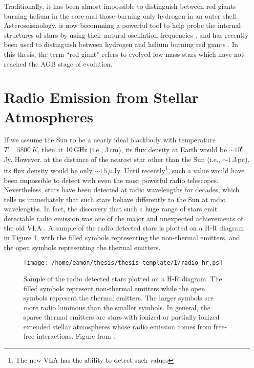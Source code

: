 Traditionally, it has been almost impossible to distinguish between red giants burning helium in the core and those burning only hydrogen in an outer shell. Asteroseismology, is now becomming a powerful tool to help probe the internal structures of stars by using their natural oscillation frequencies \citep{beck_2011}, and has recently been used to distinguish between hydrogen and helium burning red giants \citep{bedding_2011}. In this thesis, the term ``red giant'' refers to evolved low mass stars which have not reached the AGB stage of evolution.

\section{Radio Emission from Stellar Atmospheres}\label{sec:1.6}
If we assume the Sun to be a nearly ideal blackbody with temperature $T=5800\,K$, then at 10\,GHz (i.e., 3\,cm), its flux density at Earth would be $\sim 10^{6}$\,Jy. However, at the distance of the nearest star other than the Sun (i.e., $\sim 1.3$\,pc), its flux density would be only $\sim 15\,\mu$\,Jy. Until recently\footnote{The new VLA has the ability to detect such values}, such a value would have been impossible to detect with even the most powerful radio telescopes. Nevertheless, stars have been detected at radio wavelengths for decades, which tells us immediately that such stars behave differently to the Sun at radio wavelengths. In fact, the discovery that such a huge range of stars emit detectable radio emission was one of the major and unexpected achievements of the old VLA \citep{white_2000}. A sample of the radio detected stars is plotted on a H-R diagram in Figure \ref{fig:1.6.1}, with the filled symbols representing the non-thermal emitters, and the open symbols representing the thermal emitters. 

\begin{figure}[ht!]
\centering 
          \texttt{[image: /home/eamon/thesis/thesis\_template/1/radio\_hr.ps]}
\caption[Radio H-R diagram]{Sample of the radio detected stars plotted on a H-R diagram. The filled symbols represent non-thermal emitters while the open symbols represent the thermal emitters. The larger symbols are more radio luminous than the smaller symbols. In general, the sparse thermal emitters are stars with ionized or partially ionized extended stellar atmospheres whose radio emission comes from free-free interactions. Figure from \cite{white_2000}.}
\label{fig:1.6.1}
\end{figure}

